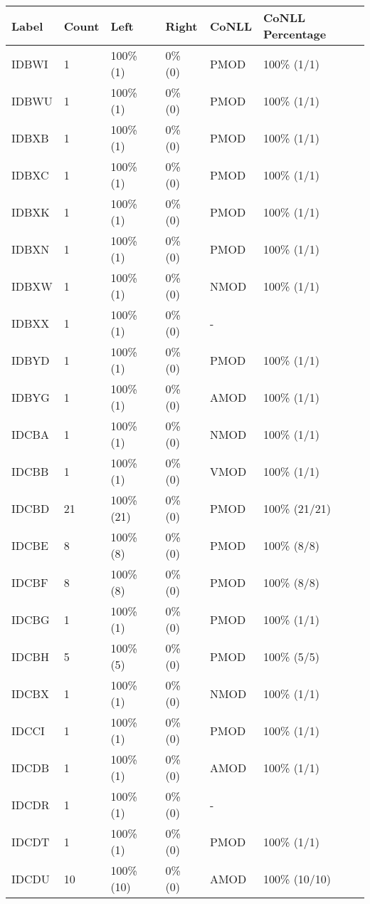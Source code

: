 \begin{figure*}
\begin{tabular}{|l|l|l|l||l|l|}
\hline
Label & Count & Left & Right & CoNLL & CoNLL Percentage\\ 
\hline
 IDBWI & 1 & 100\% (1) & 0\% (0) & PMOD & 100\% (1/1) \\ 
\hline
 IDBWU & 1 & 100\% (1) & 0\% (0) & PMOD & 100\% (1/1) \\ 
\hline
 IDBXB & 1 & 100\% (1) & 0\% (0) & PMOD & 100\% (1/1) \\ 
\hline
 IDBXC & 1 & 100\% (1) & 0\% (0) & PMOD & 100\% (1/1) \\ 
\hline
 IDBXK & 1 & 100\% (1) & 0\% (0) & PMOD & 100\% (1/1) \\ 
\hline
 IDBXN & 1 & 100\% (1) & 0\% (0) & PMOD & 100\% (1/1) \\ 
\hline
 IDBXW & 1 & 100\% (1) & 0\% (0) & NMOD & 100\% (1/1) \\ 
\hline
 IDBXX & 1 & 100\% (1) & 0\% (0) & - &  \\ 
\hline
 IDBYD & 1 & 100\% (1) & 0\% (0) & PMOD & 100\% (1/1) \\ 
\hline
 IDBYG & 1 & 100\% (1) & 0\% (0) & AMOD & 100\% (1/1) \\ 
\hline
 IDCBA & 1 & 100\% (1) & 0\% (0) & NMOD & 100\% (1/1) \\ 
\hline
 IDCBB & 1 & 100\% (1) & 0\% (0) & VMOD & 100\% (1/1) \\ 
\hline
 IDCBD & 21 & 100\% (21) & 0\% (0) & PMOD & 100\% (21/21) \\ 
\hline
 IDCBE & 8 & 100\% (8) & 0\% (0) & PMOD & 100\% (8/8) \\ 
\hline
 IDCBF & 8 & 100\% (8) & 0\% (0) & PMOD & 100\% (8/8) \\ 
\hline
 IDCBG & 1 & 100\% (1) & 0\% (0) & PMOD & 100\% (1/1) \\ 
\hline
 IDCBH & 5 & 100\% (5) & 0\% (0) & PMOD & 100\% (5/5) \\ 
\hline
 IDCBX & 1 & 100\% (1) & 0\% (0) & NMOD & 100\% (1/1) \\ 
\hline
 IDCCI & 1 & 100\% (1) & 0\% (0) & PMOD & 100\% (1/1) \\ 
\hline
 IDCDB & 1 & 100\% (1) & 0\% (0) & AMOD & 100\% (1/1) \\ 
\hline
 IDCDR & 1 & 100\% (1) & 0\% (0) & - &  \\ 
\hline
 IDCDT & 1 & 100\% (1) & 0\% (0) & PMOD & 100\% (1/1) \\ 
\hline
 IDCDU & 10 & 100\% (10) & 0\% (0) & AMOD & 100\% (10/10) \\ 

\end{tabular}
\end{figure*}
